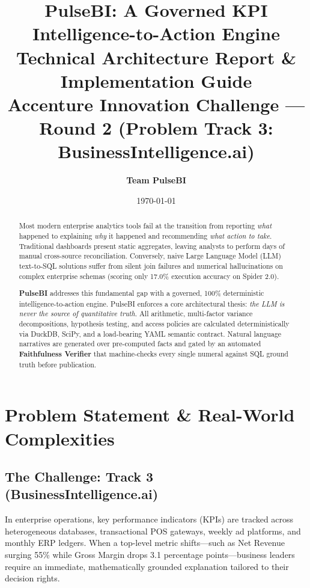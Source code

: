 \documentclass[11pt,a4paper]{article}
\title{\textbf{PulseBI: A Governed KPI Intelligence-to-Action Engine}\\
\large Technical Architecture Report \& Implementation Guide\\
\small Accenture Innovation Challenge — Round 2 (Problem Track 3: BusinessIntelligence.ai)}
\author{\textbf{Team PulseBI}}
\date{\today}
\begin{document}
\maketitle

\begin{abstract}
Most modern enterprise analytics tools fail at the transition from reporting \textit{what} happened to explaining \textit{why} it happened and recommending \textit{what action to take}. Traditional dashboards present static aggregates, leaving analysts to perform days of manual cross-source reconciliation. Conversely, naive Large Language Model (LLM) text-to-SQL solutions suffer from silent join failures and numerical hallucinations on complex enterprise schemas (scoring only 17.0\% execution accuracy on Spider 2.0). 

\textbf{PulseBI} addresses this fundamental gap with a governed, 100\% deterministic intelligence-to-action engine. PulseBI enforces a core architectural thesis: \textit{the LLM is never the source of quantitative truth}. All arithmetic, multi-factor variance decompositions, hypothesis testing, and access policies are calculated deterministically via DuckDB, SciPy, and a load-bearing YAML semantic contract. Natural language narratives are generated over pre-computed facts and gated by an automated \textbf{Faithfulness Verifier} that machine-checks every single numeral against SQL ground truth before publication.
\end{abstract}

\tableofcontents
\newpage

\section{Problem Statement \& Real-World Complexities}

\subsection{The Challenge: Track 3 (BusinessIntelligence.ai)}
In enterprise operations, key performance indicators (KPIs) are tracked across heterogeneous databases, transactional POS gateways, weekly ad platforms, and monthly ERP ledgers. When a top-level metric shifts—such as Net Revenue surging 55\% while Gross Margin drops 3.1 percentage points—business leaders require an immediate, mathematically grounded explanation tailored to their decision rights.
\end{document}
